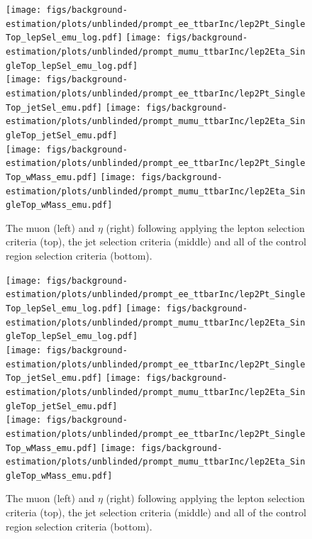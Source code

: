 \begin{figure}[h]
\centering
\texttt{[image: figs/background-estimation/plots/unblinded/prompt\_ee\_ttbarInc/lep2Pt\_SingleTop\_lepSel\_emu\_log.pdf]}
\texttt{[image: figs/background-estimation/plots/unblinded/prompt\_mumu\_ttbarInc/lep2Eta\_SingleTop\_lepSel\_emu\_log.pdf]}
\\
\texttt{[image: figs/background-estimation/plots/unblinded/prompt\_ee\_ttbarInc/lep2Pt\_SingleTop\_jetSel\_emu.pdf]}
\texttt{[image: figs/background-estimation/plots/unblinded/prompt\_mumu\_ttbarInc/lep2Eta\_SingleTop\_jetSel\_emu.pdf]}
\\
\texttt{[image: figs/background-estimation/plots/unblinded/prompt\_ee\_ttbarInc/lep2Pt\_SingleTop\_wMass\_emu.pdf]}
\texttt{[image: figs/background-estimation/plots/unblinded/prompt\_mumu\_ttbarInc/lep2Eta\_SingleTop\_wMass\_emu.pdf]}
\caption{
The muon \pT (left) and $\eta$ (right) following applying the lepton selection criteria (top), the jet selection criteria (middle) and all of the \ttbar control region selection criteria (bottom).
}
\label{fig:ttbar_muon}
\end{figure}

\begin{figure}[h]
\centering
\texttt{[image: figs/background-estimation/plots/unblinded/prompt\_ee\_ttbarInc/lep2Pt\_SingleTop\_lepSel\_emu\_log.pdf]}
\texttt{[image: figs/background-estimation/plots/unblinded/prompt\_mumu\_ttbarInc/lep2Eta\_SingleTop\_lepSel\_emu\_log.pdf]}
\\
\texttt{[image: figs/background-estimation/plots/unblinded/prompt\_ee\_ttbarInc/lep2Pt\_SingleTop\_jetSel\_emu.pdf]}
\texttt{[image: figs/background-estimation/plots/unblinded/prompt\_mumu\_ttbarInc/lep2Eta\_SingleTop\_jetSel\_emu.pdf]}
\\
\texttt{[image: figs/background-estimation/plots/unblinded/prompt\_ee\_ttbarInc/lep2Pt\_SingleTop\_wMass\_emu.pdf]}
\texttt{[image: figs/background-estimation/plots/unblinded/prompt\_mumu\_ttbarInc/lep2Eta\_SingleTop\_wMass\_emu.pdf]}
\caption{
The muon \pT (left) and $\eta$ (right) following applying the lepton selection criteria (top), the jet selection criteria (middle) and all of the \ttbar control region selection criteria (bottom).
}
\label{fig:ttbar_nJets}
\end{figure}
